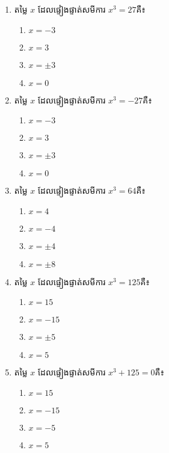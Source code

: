\begin{enumerate}
\item តម្លៃ $x$ ដែលផ្ទៀងផ្ទាត់សមីការ $x^3=27$គឺ៖
\begin{multicols}{4}
\begin{enumerate}[label=\alph*.]
	\item $x=-3$
	\item $x=3$
	\item $x=\pm 3$
	\item $x=0$
\end{enumerate}
\end{multicols}

\item តម្លៃ $x$ ដែលផ្ទៀងផ្ទាត់សមីការ $x^3=-27$គឺ៖
\begin{multicols}{4}
\begin{enumerate}[label=\alph*.]
	\item $x=-3$
	\item $x=3$
	\item $x=\pm 3$
	\item $x=0$
\end{enumerate}
\end{multicols}

\item តម្លៃ $x$ ដែលផ្ទៀងផ្ទាត់សមីការ $x^3=64$គឺ៖
\begin{multicols}{4}
\begin{enumerate}[label=\alph*.]
	\item $x=4$
	\item $x=-4$
	\item $x=\pm 4$
	\item $x=\pm 8$
\end{enumerate}
\end{multicols}

\item តម្លៃ $x$ ដែលផ្ទៀងផ្ទាត់សមីការ $x^3=125$គឺ៖
\begin{multicols}{4}
\begin{enumerate}[label=\alph*.]
	\item $x=15$
	\item $x=-15$
	\item $x=\pm 5$
	\item $x=5$
\end{enumerate}
\end{multicols}

\item តម្លៃ $x$ ដែលផ្ទៀងផ្ទាត់សមីការ $x^3+125=0$គឺ៖
\begin{multicols}{4}
\begin{enumerate}[label=\alph*.]
	\item $x=15$
	\item $x=-15$
	\item $x=-5$
	\item $x=5$
\end{enumerate}
\end{multicols}


\end{enumerate}

